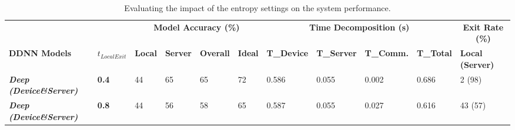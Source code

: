\documentclass[conference]{IEEEtran}
\begin{document}
    \begin{table}[htb]
    \centering
    \caption{Evaluating the impact of the entropy settings on the system performance.}
    \label{tab:entropytest}
    \scriptsize{
    \begin{tabular}{ll|llll|llll|l}
    \multicolumn{2}{l|}{}                                                & \multicolumn{4}{c|}{\textbf{Model Accuracy (\%)}}                          & \multicolumn{4}{c|}{\textbf{Time Decomposition (s)}}    & \multicolumn{1}{c}{\textbf{Exit Rate (\%)}} \\
    \textbf{DDNN Models}                    & \textbf{$t_{LocalExit}$} & \textbf{Local} & \textbf{Server} & \textbf{Overall} & \textbf{Ideal} & \textbf{T\_Device} & \textbf{T\_Server} & \textbf{T\_Comm.} & \textbf{T\_Total} & \textbf{Local (Server) } \\ \hline\hline
    \textit{\textbf{Deep (Device\&Server)}} & \textbf{0.4}               & 44             & 65              & 65              & 72             & 0.586              & 0.055              & 0.002             & 0.686             & 2 (98)                             \\
    \textit{\textbf{Deep (Device\&Server)}} & \textbf{0.8}               & 44             & 56              & 58              & 65             & 0.587              & 0.055              & 0.027             & 0.616             & 43 (57)
    \end{tabular}
    }%
    \end{table}
\end{document}
